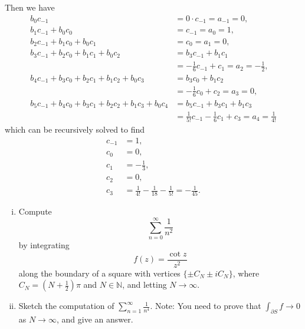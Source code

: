 \documentclass{article}
\newcounter{Problem}
\newenvironment{Problem}{\begin{Exercise}[name={Problem},
                                          counter={Problem}]}
                        {\end{Exercise}}
\begin{document}
\begin{Answer}
Then we have
\begin{align*}
  b_0 c_{-1}
&= 0 \cdot c_{-1}
 =  a_{-1}
 =  0, \\
   b_1 c_{-1}
 + b_0 c_0
&= c_{-1}
 =  a_0  = 1, \\
   b_2 c_{-1}
 + b_1 c_0
 + b_0 c_1
&= c_0
 =  a_1 =  0, \\
   b_3 c_{-1}
 + b_2 c_0
 + b_1 c_1
 + b_0 c_2
&= b_3 c_{-1}
 + b_1 c_1 \\
&= -\frac{1}{6} c_{-1}
   + c_1
 =  a_2 = -\frac{1}{2}, \\
   b_4 c_{-1}
 + b_3 c_0
 + b_2 c_1
 + b_1 c_2
 + b_0 c_3
&= b_3 c_0
 + b_1 c_2 \\
&=  -\frac{1}{6} c_0
 + c_2
 =  a_3 = 0, \\
   b_5 c_{-1}
 + b_4 c_0
 + b_3 c_1
 + b_2 c_2
 + b_1 c_3
 + b_0 c_4
&= b_5 c_{-1}
 + b_3 c_1
 + b_1 c_3 \\
&= \frac{1}{5!} c_{-1}
 - \frac{1}{6} c_1
 + c_3
 =  a_4 = \frac{1}{4!}
\end{align*}
which can be recursively solved to find
\begin{align*}
c_{-1} &= 1, \\
c_0   &= 0, \\
c_1   &= -\frac{1}{3}, \\
c_2   &= 0, \\
c_3   &= \frac{1}{4!} - \frac{1}{18} - \frac{1}{5!}
       = -\frac{1}{45}.
\end{align*}
\end{Answer}

\begin{Problem}
  \begin{enumerate}[(i)]
    \item{
       Compute
       $$
       \sum_{n=0}^\infty \frac{1}{n^2}
       $$
       by integrating
       $$
       f(z) = \frac{\cot z}{z^2}
       $$
       along the boundary of a square with vertices
       $\{ \pm C_N \pm i C_N \}$, where $C_N = (N + \frac{1}{2})\pi$
       and $N \in \mathbb{N}$, and letting $N \to \infty$.
    }
    \item{
      Sketch the computation of
      $\sum_{n=1}^\infty \frac{1}{n^4}$. Note: You need to prove
      that $\int_{\partial S} f \to 0$ as $N \to \infty$, and give an answer.
    }
  \end{enumerate}
\end{Problem}
\end{document}
